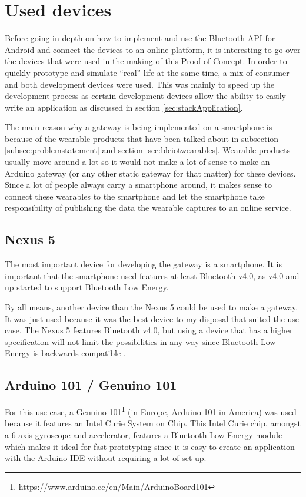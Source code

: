 \documentclass[pdftex,a4paper,12pt,twoside]{report}
\begin{document}
\section{Used devices}
\label{sec:devices}
Before going in depth on how to implement and use the Bluetooth API for Android and connect the devices to an online platform, it is interesting to go over the devices that were used in the making of this Proof of Concept. In order to quickly prototype and simulate ``real'' life at the same time, a mix of consumer and both development devices were used. This was mainly to speed up the development process as certain development devices allow the ability to easily write an application as discussed in section \ref{sec:stackApplication}.

The main reason why a gateway is being implemented on a smartphone is because of the wearable products that have been talked about in subsection \ref{subsec:problemstatement} and section \ref{sec:bleiotwearables}. Wearable products usually move around a lot so it would not make a lot of sense to make an Arduino gateway (or any other static gateway for that matter) for these devices. Since a lot of people always carry a smartphone around, it makes sense to connect these wearables to the smartphone and let the smartphone take responsibility of publishing the data the wearable captures to an online service.

\subsection{Nexus 5}
\label{subsec:nexus}
The most important device for developing the gateway is a smartphone. It is important that the smartphone used features at least Bluetooth v4.0, as v4.0 and up started to support Bluetooth Low Energy.

By all means, another device than the Nexus 5 could be used to make a gateway. It was just used because it was the best device to my disposal that suited the use case. The Nexus 5 features Bluetooth v4.0, but using a device that has a higher specification will not limit the possibilities in any way since Bluetooth Low Energy is backwards compatible \citep{bluetooth2014bluetooth}.

\subsection{Arduino 101 / Genuino 101}
\label{subsec:arduino101}
For this use case, a Genuino 101\footnote{\url{https://www.arduino.cc/en/Main/ArduinoBoard101}} (in Europe, Arduino 101 in America) was used because it features an Intel Curie System on Chip. This Intel Curie chip, amongst a 6 axis gyroscope and accelerator, features a Bluetooth Low Energy module which makes it ideal for fast prototyping since it is easy to create an application with the Arduino IDE without requiring a lot of set-up.
\end{document}
